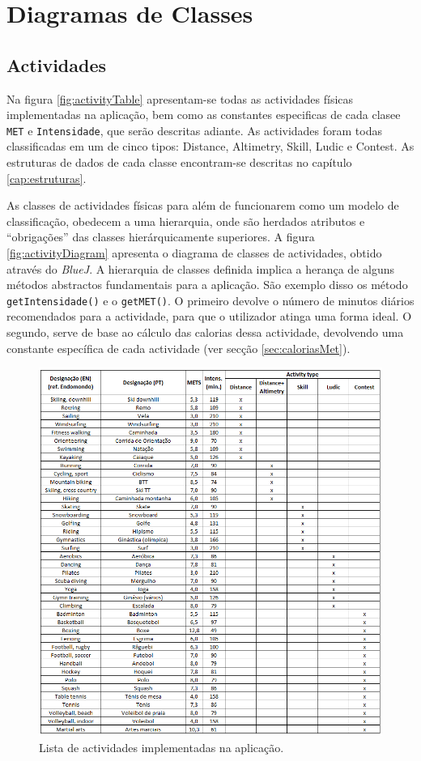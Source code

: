 \documentclass[a4paper,10pt]{report}
\begin{document}
\section{Diagramas de Classes}
\label{sec:classes}
\subsection{Actividades}
\label{subsec:actividadesDiagrama}
Na figura \ref{fig:activityTable} apresentam-se todas as actividades físicas implementadas na aplicação, 
bem como as constantes especificas de cada clasee \verb!MET! e \verb!Intensidade!, que serão descritas adiante.
As actividades foram todas classificadas em um de cinco tipos: Distance, Altimetry, Skill, Ludic e Contest.
As estruturas de dados de cada classe encontram-se descritas no capítulo \ref{cap:estruturas}.

As classes de actividades físicas para além de funcionarem como um modelo de classificação, 
obedecem a uma hierarquia, onde são herdados atributos e ``obrigações'' das classes hierárquicamente superiores.
A figura \ref{fig:activityDiagram} apresenta o diagrama de classes de actividades, obtido através do \emph{BlueJ}.
A hierarquia de classes definida implica a herança de alguns métodos abstractos fundamentais para a aplicação.
São exemplo disso os método \verb!getIntensidade()! e o \verb!getMET()!.
O primeiro devolve o número de minutos diários recomendados para a actividade, para que o utilizador atinga uma forma ideal. 
O segundo, serve de base ao cálculo das calorias dessa actividade, devolvendo uma constante específica de cada actividade (ver secção \ref{sec:caloriasMet}).

\begin{figure}
\centering
\includegraphics[width=\textwidth]{activitiesTable.png}
\caption{Lista de actividades implementadas na aplicação.}
\label{fig:activitiesTable}
\end{figure}
\end{document}
